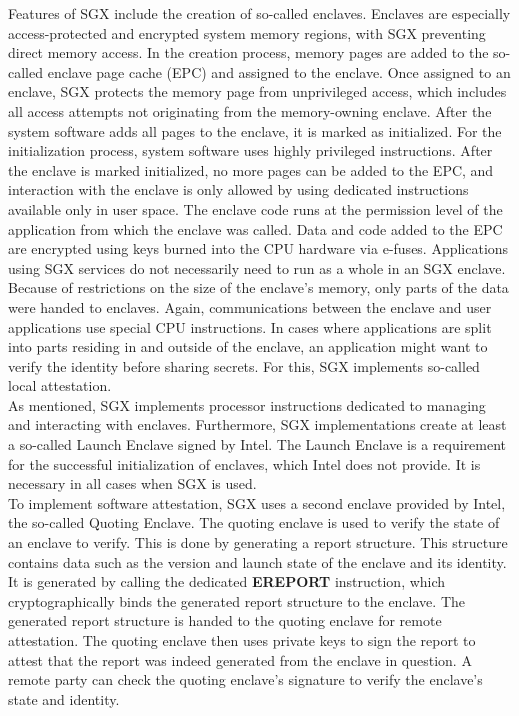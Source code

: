 Features of SGX include the creation of so-called enclaves. Enclaves are
especially access-protected and encrypted system memory regions, with SGX
preventing direct memory access. In the creation process, memory pages are added
to the so-called enclave page cache (EPC) and assigned to the enclave. Once
assigned to an enclave, SGX protects the memory page from unprivileged access,
which includes all access attempts not originating from the memory-owning
enclave. After the system software adds all pages to the enclave, it is marked
as initialized. For the initialization process, system software uses highly
privileged instructions. After the enclave is marked initialized, no more pages
can be added to the EPC, and interaction with the enclave is only allowed by
using dedicated instructions available only in user space. The enclave code runs
at the permission level of the application from which the enclave was called.
Data and code added to the EPC are encrypted using keys burned into the CPU
hardware via e-fuses. Applications using SGX services do not necessarily need to
run as a whole in an SGX enclave. Because of restrictions on the size of the
enclave's memory, only parts of the data were handed to enclaves. Again,
communications between the enclave and user applications use special CPU
instructions. In cases where applications are split into parts residing in and
outside of the enclave, an application might want to verify the identity before
sharing secrets. For this, SGX implements so-called local attestation.\\

As mentioned, SGX implements processor instructions dedicated to managing and
interacting with enclaves. Furthermore, SGX implementations create at least a
so-called Launch Enclave signed by Intel. The Launch Enclave is a requirement
for the successful initialization of enclaves, which Intel does not provide. It
is necessary in all cases when SGX is used.\\

To implement software attestation, SGX uses a second enclave provided by Intel,
the so-called Quoting Enclave. The quoting enclave is used to verify the state
of an enclave to verify. This is done by generating a report structure. This
structure contains data such as the version and launch state of the enclave and
its identity. It is generated by calling the dedicated \textbf{EREPORT}
instruction, which cryptographically binds the generated report structure to the
enclave. The generated report structure is handed to the quoting enclave for
remote attestation. The quoting enclave then uses private keys to sign the
report to attest that the report was indeed generated from the enclave in
question. A remote party can check the quoting enclave's signature to verify the
enclave's state and identity.\\

